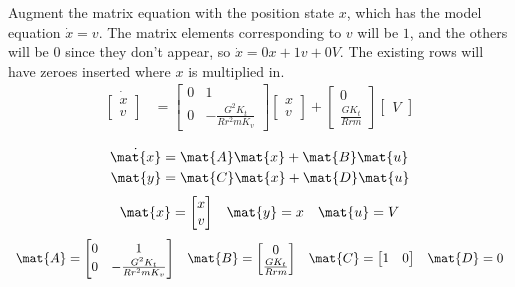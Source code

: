 Augment the matrix equation with the position state $x$, which has the model
equation $\dot{x} = v$. The matrix elements corresponding to $v$ will be $1$,
and the others will be $0$ since they don't appear, so $\dot{x} = 0x + 1v + 0V$.
The existing rows will have zeroes inserted where $x$ is multiplied in.
\begin{align*}
  \dot{\begin{bmatrix}
    x \\
    v
  \end{bmatrix}} &=
  \begin{bmatrix}
    0 & 1 \\
    0 & -\frac{G^2 K_t}{Rr^2 m K_v}
  \end{bmatrix}
  \begin{bmatrix}
    x \\
    v
  \end{bmatrix} +
  \begin{bmatrix}
    0 \\
    \frac{GK_t}{Rrm}
  \end{bmatrix}
  \begin{bmatrix}
    V
  \end{bmatrix}
\end{align*}
\begin{theorem}
  \begin{align*}
    \dot{\mat{x}} &= \mat{A} \mat{x} + \mat{B} \mat{u} \\
    \mat{y} &= \mat{C} \mat{x} + \mat{D} \mat{u}
  \end{align*}
  \begin{equation*}
    \begin{array}{ccc}
      \mat{x} =
      \begin{bmatrix}
        x \\
        v
      \end{bmatrix} &
      \mat{y} = x &
      \mat{u} = V
    \end{array}
  \end{equation*}
  \begin{equation}
    \begin{array}{cccc}
      \mat{A} =
      \begin{bmatrix}
        0 & 1 \\
        0 & -\frac{G^2 K_t}{Rr^2 mK_v}
      \end{bmatrix} &
      \mat{B} =
      \begin{bmatrix}
        0 \\
        \frac{GK_t}{Rrm}
      \end{bmatrix} &
      \mat{C} =
      \begin{bmatrix}
        1 & 0
      \end{bmatrix} &
      \mat{D} = 0
    \end{array}
  \end{equation}
\end{theorem}


